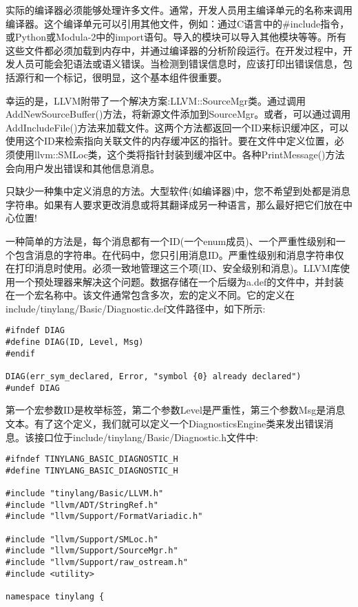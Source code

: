 实际的编译器必须能够处理许多文件。通常，开发人员用主编译单元的名称来调用编译器。这个编译单元可以引用其他文件，例如：通过C语言中的\#include指令，或Python或Modula-2中的import语句。导入的模块可以导入其他模块等等。所有这些文件都必须加载到内存中，并通过编译器的分析阶段运行。在开发过程中，开发人员可能会犯语法或语义错误。当检测到错误信息时，应该打印出错误信息，包括源行和一个标记，很明显，这个基本组件很重要。\par

幸运的是，LLVM附带了一个解决方案:LLVM::SourceMgr类。通过调用AddNewSourceBuffer()方法，将新源文件添加到SourceMgr。或者，可以通过调用AddIncludeFile()方法来加载文件。这两个方法都返回一个ID来标识缓冲区，可以使用这个ID来检索指向关联文件的内存缓冲区的指针。要在文件中定义位置，必须使用llvm::SMLoc类，这个类将指针封装到缓冲区中。各种PrintMessage()方法会向用户发出错误和其他信息消息。\par

只缺少一种集中定义消息的方法。大型软件(如编译器)中，您不希望到处都是消息字符串。如果有人要求更改消息或将其翻译成另一种语言，那么最好把它们放在中心位置!\par

一种简单的方法是，每个消息都有一个ID(一个enum成员)、一个严重性级别和一个包含消息的字符串。在代码中，您只引用消息ID。严重性级别和消息字符串仅在打印消息时使用。必须一致地管理这三个项(ID、安全级别和消息)。LLVM库使用一个预处理器来解决这个问题。数据存储在一个后缀为a.def的文件中，并封装在一个宏名称中。该文件通常包含多次，宏的定义不同。它的定义在include/tinylang/Basic/Diagnostic.def文件路径中，如下所示:\par

\begin{lstlisting}[caption={}]
#ifndef DIAG
#define DIAG(ID, Level, Msg)
#endif

DIAG(err_sym_declared, Error, "symbol {0} already declared")
#undef DIAG
\end{lstlisting}

第一个宏参数ID是枚举标签，第二个参数Level是严重性，第三个参数Msg是消息文本。有了这个定义，我们就可以定义一个DiagnosticsEngine类来发出错误消息。该接口位于include/tinylang/Basic/Diagnostic.h文件中:\par

\begin{lstlisting}[caption={}]
#ifndef TINYLANG_BASIC_DIAGNOSTIC_H
#define TINYLANG_BASIC_DIAGNOSTIC_H

#include "tinylang/Basic/LLVM.h"
#include "llvm/ADT/StringRef.h"
#include "llvm/Support/FormatVariadic.h"

#include "llvm/Support/SMLoc.h"
#include "llvm/Support/SourceMgr.h"
#include "llvm/Support/raw_ostream.h"
#include <utility>

namespace tinylang {
\end{lstlisting}

